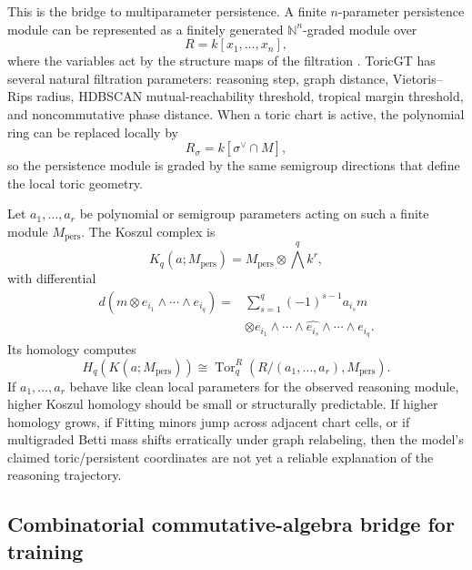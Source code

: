 \documentclass[11pt]{article}
\theoremstyle{definition}
\theoremstyle{plain}
\theoremstyle{remark}
\numberwithin{equation}{section}
\newcommand{\N}{\mathbb{N}}
\begin{document}
This is the bridge to multiparameter persistence.  A finite $n$-parameter persistence module can be represented as a finitely generated $\N^n$-graded module over
\begin{equation}
  R=k[x_1,\ldots,x_n],
\end{equation}
where the variables act by the structure maps of the filtration \cite{schreiber2022multiparameter}.  ToricGT has several natural filtration parameters: reasoning step, graph distance, Vietoris--Rips radius, HDBSCAN mutual-reachability threshold, tropical margin threshold, and noncommutative phase distance.  When a toric chart is active, the polynomial ring can be replaced locally by
\begin{equation}
  R_\sigma=k[\sigma^\vee\cap M],
\end{equation}
so the persistence module is graded by the same semigroup directions that define the local toric geometry.

Let $a_1,\ldots,a_r$ be polynomial or semigroup parameters acting on such a finite module $M_{\mathrm{pers}}$.  The Koszul complex is
\begin{equation}
  K_q(a;M_{\mathrm{pers}})=M_{\mathrm{pers}}\otimes \bigwedge^q k^r,
\end{equation}
with differential
\begin{equation}
\begin{split}
  d(m\otimes e_{i_1}\wedge\cdots\wedge e_{i_q})
  ={}&\sum_{s=1}^q (-1)^{s-1}a_{i_s}m\\
  &\otimes e_{i_1}\wedge\cdots\wedge \widehat{e_{i_s}}\wedge\cdots\wedge e_{i_q}.
\end{split}
\end{equation}
Its homology computes
\begin{equation}
  H_q(K(a;M_{\mathrm{pers}}))\cong
  \operatorname{Tor}^{R}_q(R/(a_1,\ldots,a_r),M_{\mathrm{pers}}).
\end{equation}
If $a_1,\ldots,a_r$ behave like clean local parameters for the observed reasoning module, higher Koszul homology should be small or structurally predictable.  If higher homology grows, if Fitting minors jump across adjacent chart cells, or if multigraded Betti mass shifts erratically under graph relabeling, then the model's claimed toric/persistent coordinates are not yet a reliable explanation of the reasoning trajectory.

\subsection{Combinatorial commutative-algebra bridge for training}
\end{document}
